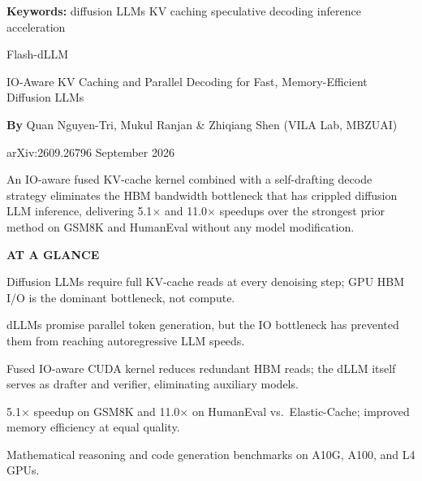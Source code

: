 \documentclass[10pt,twocolumn]{article}
\begin{document}
\setlength{\parindent}{0pt}
\setlength{\parskip}{4pt}

{\small\color{keywordgray}\textbf{Keywords:}
  diffusion LLMs \textbullet{}
  KV caching \textbullet{}
  speculative decoding \textbullet{}
  inference acceleration}\par\vspace{4pt}

{\LARGE\bfseries\raggedright
  Flash-dLLM}\par\vspace{4pt}

{\large\itshape\raggedright
  IO-Aware KV Caching and Parallel Decoding for Fast,
  Memory-Efficient Diffusion LLMs}\par\vspace{6pt}

{\small\textbf{By} Quan Nguyen-Tri, Mukul Ranjan \&
  Zhiqiang Shen (VILA Lab, MBZUAI)}\par\vspace{2pt}

{\small\color{keywordgray}arXiv:2609.26796 \textbullet{} September 2026}
\par\vspace{2pt}\noindent{\color{rulered}\rule{\columnwidth}{0.6pt}}\vspace{6pt}

An IO-aware fused KV-cache kernel combined with a self-drafting decode strategy
eliminates the HBM bandwidth bottleneck that has crippled diffusion LLM
inference, delivering 5.1$\times$ and 11.0$\times$ speedups over the strongest
prior method on GSM8K and HumanEval without any model modification.

\begin{mdframed}[backgroundcolor=boxgray,linecolor=rulered,linewidth=1pt,
    innerleftmargin=6pt,innerrightmargin=6pt,
    innertopmargin=6pt,innerbottommargin=6pt]
\textbf{\small AT A GLANCE}\par\vspace{4pt}
\begin{description}[leftmargin=0pt,labelsep=4pt,itemsep=2pt,parsep=0pt,
    font=\small\bfseries]
  \item[Problem:] Diffusion LLMs require full KV-cache reads at every denoising
    step; GPU HBM I/O is the dominant bottleneck, not compute.
  \item[Why it matters:] dLLMs promise parallel token generation, but the IO
    bottleneck has prevented them from reaching autoregressive LLM speeds.
  \item[Method:] Fused IO-aware CUDA kernel reduces redundant HBM reads;
    the dLLM itself serves as drafter and verifier, eliminating auxiliary models.
  \item[Result:] 5.1$\times$ speedup on GSM8K and 11.0$\times$ on HumanEval
    vs.\ Elastic-Cache; improved memory efficiency at equal quality.
  \item[Evidence:] Mathematical reasoning and code generation benchmarks
    on A10G, A100, and L4 GPUs.
\end{description}
\end{mdframed}
\end{document}
